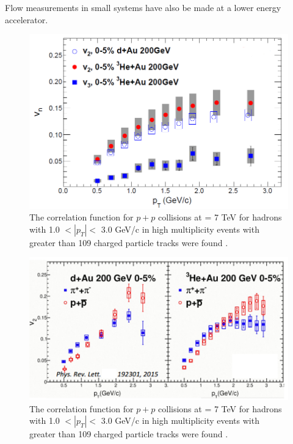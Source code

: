 Flow measurements in small systems have also be made at a lower energy accelerator. 

\begin{figure}[h!]
\begin{center}
\includegraphics[width=0.75\linewidth]{figs/hedau_v2_v3.PNG}
\caption{ The correlation function for $p+p$ collisions at \sqsn = 7 TeV for hadrons with 1.0 $<|p_T|<$ 3.0 GeV/c in high multiplicity events with greater than 109 charged particle tracks were found \cite{Khachatryan2010}.}
\label{fig:pp_ridge_plot}
\end{center}
\end{figure}

\begin{figure}[h!]
\begin{center}
\includegraphics[width=0.65\linewidth]{figs/dhau_mass_ordering_phenix.PNG}
\caption{ The correlation function for $p+p$ collisions at \sqsn = 7 TeV for hadrons with 1.0 $<|p_T|<$ 3.0 GeV/c in high multiplicity events with greater than 109 charged particle tracks were found \cite{Khachatryan2010}.}
\label{fig:pp_ridge_plot}
\end{center}
\end{figure}

